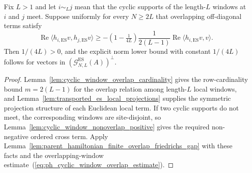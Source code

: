 \begin{lemma}
    \label{lem:parent_hamiltonian_cyclic_window_friedrichs_gap}
    \leanok
    Fix $L>1$ and let $i\sim_L j$ mean that the cyclic supports of the
    length-$L$ windows at $i$ and $j$ meet. Suppose uniformly for every
    $N\ge2L$ that overlapping off-diagonal terms satisfy
    \begin{equation}\label{eq:ph_cyclic_window_overlap_estimate}
        \operatorname{Re}\langle h_{i,\mathrm{ES}}v,h_{j,\mathrm{ES}}v\rangle
        \ge -(1-\tfrac{1}{4L})\frac{1}{2(L-1)}
        \operatorname{Re}\langle h_{i,\mathrm{ES}}v,v\rangle.
    \end{equation}
    Then $1/(4L)>0$, and the explicit norm lower bound with constant $1/(4L)$
    follows for vectors in $(\mathcal G_{N,L}^{\mathrm{ES}}(A))^\perp$.
\end{lemma}

\begin{proof}
    \leanok
    Lemma~\ref{lem:cyclic_window_overlap_cardinality} gives the row-cardinality
    bound $m=2(L-1)$ for the overlap relation among length-$L$ local windows,
    and
    Lemma~\ref{lem:transported_es_local_projections} supplies the symmetric
    projection structure of each Euclidean local term. If two cyclic supports
    do not meet, the corresponding windows are site-disjoint, so
    Lemma~\ref{lem:cyclic_window_nonoverlap_positive} gives the required
    non-negative ordered cross term. Apply
    Lemma~\ref{lem:parent_hamiltonian_finite_overlap_friedrichs_gap} with these
    facts and the overlapping-window estimate~(\ref{eq:ph_cyclic_window_overlap_estimate}).
\end{proof}

